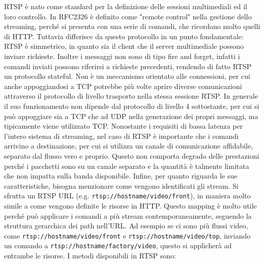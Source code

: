 RTSP è nato come standard per la definizione delle sessioni multimediali ed il loro controllo. %
In RFC2326 è definito come "remote control" nella gestione dello streaming, perché si presenta con una serie di comandi, che ricordano molto quelli di HTTP. Tuttavia differisce da questo protocollo in un punto fondamentale: RTSP è simmetrico, in quanto sia il client che il server multimediale possono inviare richieste. Inoltre i messaggi non sono di tipo fire and forget, infatti i comandi inviati possono riferirsi a richieste precedenti, rendendo di fatto RTSP un protocollo stateful\cite{a9rfc2326}. %
Non è un meccanismo orientato alle connessioni, per cui anche appoggiandosi a TCP potrebbe più volte aprire diverse comunicazioni attraverso il protocollo di livello trasporto nella stessa sessione RTSP. In generale il suo funzionamento non dipende dal protocollo di livello 4 sottostante, per cui si può appoggiare sia a TCP che ad UDP nella generazione dei propri messaggi, ma tipicamente viene utilizzato TCP. Nonostante i requisiti di bassa latenza per l'intero sistema di streaming, nel caso di RTSP è importante che i comandi arrivino a destinazione, per cui si utilizza un canale di comunicazione affidabile, separato dal flusso vero e proprio. Questo non comporta degrado delle prestazioni perché i pacchetti sono su un canale separato e la quantità è talmente limitata che non impatta sulla banda disponibile. Infine, per quanto riguarda le sue caratteristiche, bisogna menzionare come vengono identificati gli stream. Si sfrutta un RTSP URL (e.g. \texttt{rtsp://hostname/video/front}), in maniera molto simile a come vengono definite le risorse in HTTP. Questo mapping è molto utile perché può applicare i comandi a più stream contemporaneamente, seguendo la struttura gerarchica dei path nell'URL. Ad esempio se ci sono più flussi video, come \texttt{rtsp://hostname/video/front} e \texttt{rtsp://hostname/video/top}, inviando un comando a \sloppy\texttt{rtsp://hostname/factory/video}\fussy, questo si applicherà ad entrambe le risorse. %
I metodi disponibili in RTSP sono:
